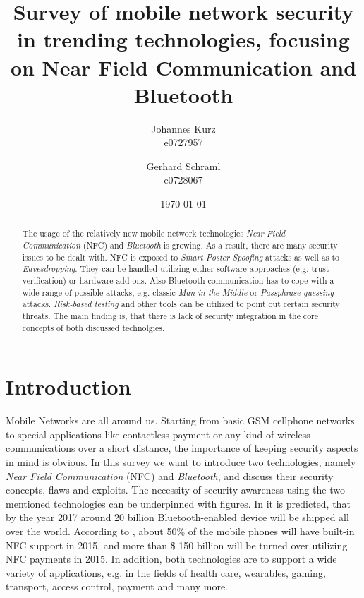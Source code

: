 \documentclass[12pt,a4paper]{article}
\title{ Survey of mobile network security in trending technologies, focusing on Near Field Communication and Bluetooth }
\author{ Johannes Kurz \\
         e0727957 \\%
         \and
         Gerhard Schraml \\
         e0728067 %
}
\date{\today}
\begin{document}
\maketitle

\begin{abstract}
\noindent
The usage of the relatively new mobile network technologies \emph{Near Field Communication} (NFC) and \emph{Bluetooth} is growing. As a result, there are many security issues to be dealt with. NFC is exposed to \emph{Smart Poster Spoofing} attacks as well as to \emph{Eavesdropping}. They can be handled utilizing either software approaches (e.g. trust verification) or hardware add-ons. Also Bluetooth communication has to cope with a wide range of possible attacks, e.g. classic \emph{Man-in-the-Middle} or \emph{Passphrase guessing} attacks. \emph{Risk-based testing} and other tools can be utilized to point out certain security threats. The main finding is, that there is lack of security integration in the core concepts of both discussed technolgies.
\end{abstract}


\section{Introduction}


Mobile Networks are all around us. Starting from basic GSM cellphone networks to special applications like contactless payment or any kind of wireless communications over a short distance, the importance of keeping security aspects in mind is obvious. In this survey we want to introduce two technologies, namely \emph{Near Field Communication} (NFC) and \emph{Bluetooth}, and discuss their security concepts, flaws and exploits. The necessity of security awareness using the two mentioned technologies can be underpinned with figures. In \cite{DBLP:conf/greencom/XuZLMLCSTY13} it is predicted, that by the year 2017 around 20 billion Bluetooth-enabled device will be shipped all over the world. According to \cite{DBLP:conf/trustcom/HameedHHK14}, about 50\% of the mobile phones will have built-in NFC support in 2015, and more than \$ 150 billion will be turned over utilizing NFC payments in 2015.
In addition, both technologies are to support a wide variety of applications, e.g. in the fields of health care, wearables, gaming, transport, access control, payment and many more.
\end{document}
